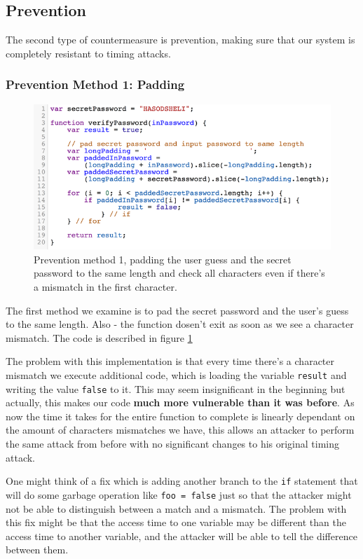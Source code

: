 \subsection{Prevention}
The second type of countermeasure is prevention, making sure that our system is
completely resistant to timing attacks.

\subsubsection{Prevention Method 1: Padding}
\begin{figure}[H]
    \centering
    \includegraphics{images/chapter_1/password_check_algo_2.png}
    \caption
    {Prevention method 1, padding the user guess and the secret password to the
    same length and check all characters even if there's a mismatch in the first
    character.}
    \label{c1_fig_pass_check_2}
\end{figure}

The first method we examine is to pad the secret password and the user's guess
to the same length. Also - the function dosen't exit as soon as we see a character
mismatch. The code is described in figure 
 \ref{c1_fig_pass_check_2}

The problem with this implementation is that every time there's a character
mismatch we execute additional code, which is loading the variable
\lstinline{result} and writing the value \lstinline{false} to it. This may seem
insignificant in the beginning but actually, this makes our code \textbf{much
more vulnerable than it was before}. As now the time it takes for the entire
function to complete is linearly dependant on the amount of characters
mismatches we have, this allows an attacker to perform the same attack from
before with no significant changes to his original timing attack.

One might think of a fix which is adding another branch to the \lstinline{if}
statement that will do some garbage operation like \lstinline{foo = false} just
so that the attacker might not be able to distinguish between a match
and a mismatch. The problem with this fix might be that the access time to one
variable may be different than the access time to another variable, and the
attacker will be able to tell the difference between them.


